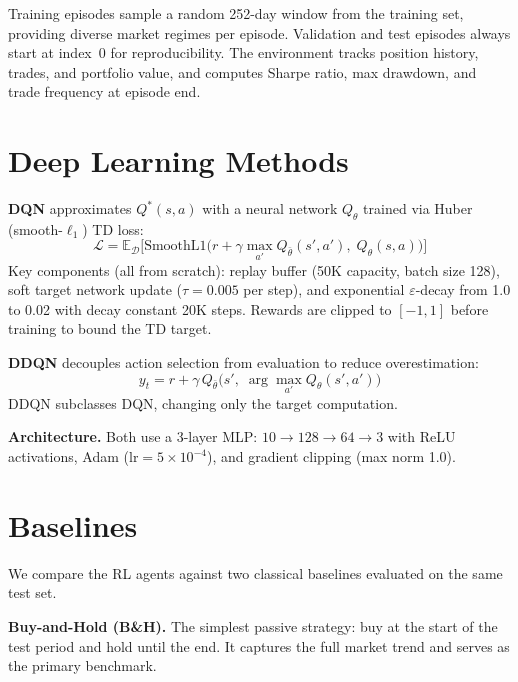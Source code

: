 \documentclass[11pt,twocolumn]{article}
\begin{document}
Training episodes sample a random 252-day window from the training set, providing diverse market regimes per episode. Validation and test episodes always start at index~0 for reproducibility.
The environment tracks position history, trades, and portfolio value, and computes Sharpe ratio, max drawdown, and trade frequency at episode end.

\section{Deep Learning Methods}

\textbf{DQN} approximates $Q^*(s,a)$ with a neural network $Q_\theta$ trained via Huber (smooth-$\ell_1$) TD loss:
\begin{equation}
  \mathcal{L} = \mathbb{E}_{\mathcal{D}} \!\Big[\!
    \text{SmoothL1}\!\big( r + \gamma \max_{a'} Q_{\bar\theta}(s', a'),\; Q_\theta(s, a) \big)
  \Big]
  \label{eq:dqn}
\end{equation}
Key components (all from scratch): replay buffer (50K capacity, batch size 128), soft target network update ($\tau{=}0.005$ per step), and exponential $\varepsilon$-decay from 1.0 to 0.02 with decay constant 20K steps.
Rewards are clipped to $[-1,1]$ before training to bound the TD target.

\textbf{DDQN} decouples action selection from evaluation to reduce overestimation:
\begin{equation}
  y_t = r + \gamma \, Q_{\bar\theta}\!\bigl(s',\; \arg\max_{a'} Q_\theta(s', a')\bigr)
  \label{eq:ddqn}
\end{equation}
DDQN subclasses DQN, changing only the target computation.

\textbf{Architecture.}
Both use a 3-layer MLP: $10 \to 128 \to 64 \to 3$ with ReLU activations, Adam ($\text{lr}{=}5{\times}10^{-4}$), and gradient clipping (max norm 1.0).

\section{Baselines}

We compare the RL agents against two classical baselines evaluated on the same test set.

\textbf{Buy-and-Hold (B\&H).}
The simplest passive strategy: buy at the start of the test period and hold until the end.
It captures the full market trend and serves as the primary benchmark.
\end{document}
